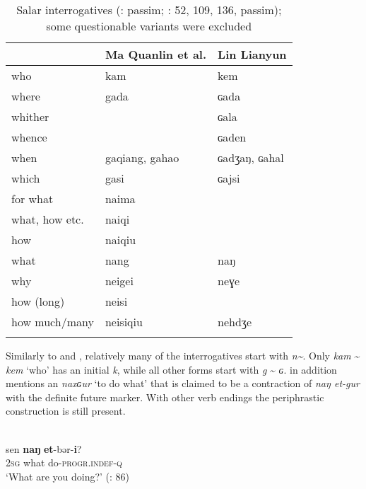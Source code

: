 \begin{table}
\caption{Salar interrogatives (\citealt{Ma1993}: passim; \citealt{LinLianyun1985}: 52, 109, 136, passim); some questionable variants were excluded}
\label{tab:turk:10}

\begin{tabularx}{\textwidth}{XXl}
\lsptoprule
& \textbf{Ma Quanlin et al.} & \textbf{Lin Lianyun}\\
\midrule
who & kam & kem\\
where & gada & ɢada\\
whither &  & ɢala\\
whence &  & ɢaden\\
when & gaqiang, gahao & ɢadʒaŋ, ɢahal\\
which & gasi & ɢajsi\\
for what & naima & \\
what, how etc. & naiqi & \\
how & naiqiu & \\
what & nang & naŋ\\
why & neigei & neɣe\\
how (long) & neisi & \\
how much/many & neisiqiu & nehdʒe\\
\lspbottomrule
\end{tabularx}
\end{table}

\noindent Similarly to  and , relatively many of the interrogatives start with \textit{n{\textasciitilde}}. Only \textit{kam} {\textasciitilde} \textit{kem} ‘who’ has an initial \textit{k}, while all other forms start with \textit{g} {\textasciitilde} \textit{ɢ}. \citet[76]{LinLianyun1985} in addition mentions an  \textit{naxɢur} ‘to do what’ that is claimed to be a contraction of \textit{naŋ et-gur} with the definite future marker. With other verb endings the periphrastic construction is still present.

\ea%
    \label{ex:turk:66}
    \\
    \gll sen \textbf{{naŋ}} \textbf{{et}}{-bər-}\textbf{{i}}?\\
    2\textsc{sg}  what  do-\textsc{progr}.\textsc{indef}-\textsc{q}\\
    \glt ‘What are you doing?’ (\citealt{LinLianyun1985}: 86)
    \z

